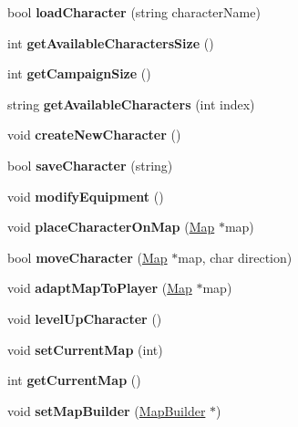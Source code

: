 \begin{DoxyCompactItemize}
bool {\bfseries load\+Character} (string character\+Name)
\item 
\hypertarget{class_play_ad3beef5861eb27b6b79ee31ae1e08504}{}\label{class_play_ad3beef5861eb27b6b79ee31ae1e08504} 
int {\bfseries get\+Available\+Characters\+Size} ()
\item 
\hypertarget{class_play_abdaadd10c199a1cb3c3c9ab936701122}{}\label{class_play_abdaadd10c199a1cb3c3c9ab936701122} 
int {\bfseries get\+Campaign\+Size} ()
\item 
\hypertarget{class_play_a1eb9d18fd63ae2e2ac53187c20aab9aa}{}\label{class_play_a1eb9d18fd63ae2e2ac53187c20aab9aa} 
string {\bfseries get\+Available\+Characters} (int index)
\item 
\hypertarget{class_play_a249b82b8bb5928f598e2f9ebbfe50caf}{}\label{class_play_a249b82b8bb5928f598e2f9ebbfe50caf} 
void {\bfseries create\+New\+Character} ()
\item 
\hypertarget{class_play_a160b15f0f0e1390c650dadc8af52cdb2}{}\label{class_play_a160b15f0f0e1390c650dadc8af52cdb2} 
bool {\bfseries save\+Character} (string)
\item 
\hypertarget{class_play_ad7a55235bc6f657fda288549e2a840ee}{}\label{class_play_ad7a55235bc6f657fda288549e2a840ee} 
void {\bfseries modify\+Equipment} ()
\item 
\hypertarget{class_play_ae32a5c6b3a2e2e30722a523a5da78705}{}\label{class_play_ae32a5c6b3a2e2e30722a523a5da78705} 
void {\bfseries place\+Character\+On\+Map} (\hyperlink{class_map}{Map} $\ast$map)
\item 
\hypertarget{class_play_ab205e0f453258c40f2b2897c40d6bed9}{}\label{class_play_ab205e0f453258c40f2b2897c40d6bed9} 
bool {\bfseries move\+Character} (\hyperlink{class_map}{Map} $\ast$map, char direction)
\item 
\hypertarget{class_play_a67fc2a01a6d1777b1abeae01e830885f}{}\label{class_play_a67fc2a01a6d1777b1abeae01e830885f} 
void {\bfseries adapt\+Map\+To\+Player} (\hyperlink{class_map}{Map} $\ast$map)
\item 
\hypertarget{class_play_a5bc71c7d9cf9669928178501a74b8bcb}{}\label{class_play_a5bc71c7d9cf9669928178501a74b8bcb} 
void {\bfseries level\+Up\+Character} ()
\item 
\hypertarget{class_play_a0cd74f6325ddd8b1a1c9793e3f955d59}{}\label{class_play_a0cd74f6325ddd8b1a1c9793e3f955d59} 
void {\bfseries set\+Current\+Map} (int)
\item 
\hypertarget{class_play_a9a9dfca95eed4cab3fafae5308ccb59c}{}\label{class_play_a9a9dfca95eed4cab3fafae5308ccb59c} 
int {\bfseries get\+Current\+Map} ()
\item 
\hypertarget{class_play_a01a981cbef93cde2829f004b98b1d576}{}\label{class_play_a01a981cbef93cde2829f004b98b1d576} 
void {\bfseries set\+Map\+Builder} (\hyperlink{class_map_builder}{Map\+Builder} $\ast$)
\end{DoxyCompactItemize}


